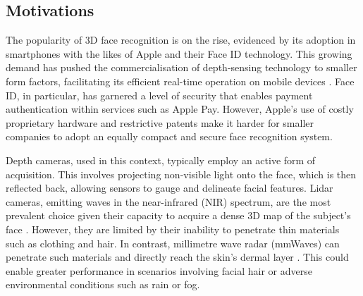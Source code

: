 \documentclass{mpaper}
\begin{document}
\subsection{Motivations}
The popularity of 3D face recognition is on the rise, evidenced by its adoption in smartphones with the likes of Apple and their Face ID \cite{apple-faceid} technology. This growing demand has pushed the commercialisation of depth-sensing technology to smaller form factors, facilitating its efficient real-time operation on mobile devices \cite{soumya2023recent}. Face ID, in particular, has garnered a level of security that enables payment authentication within services such as Apple Pay. However, Apple's use of costly proprietary hardware and restrictive patents make it harder for smaller companies to adopt an equally compact and secure face recognition system.

Depth cameras, used in this context, typically employ an active form of acquisition. This involves projecting non-visible light onto the face, which is then reflected back, allowing sensors to gauge and delineate facial features. Lidar cameras, emitting waves in the near-infrared (NIR) spectrum, are the most prevalent choice given their capacity to acquire a dense 3D map of the subject's face \cite{wang2020evolution}. However, they are limited by their inability to penetrate thin materials such as clothing and hair. In contrast, millimetre wave radar (mmWaves) can penetrate such materials and directly reach the skin's dermal layer \cite{vizard2006advances}. This could enable greater performance in scenarios involving facial hair or adverse environmental conditions such as rain or fog.
\end{document}
